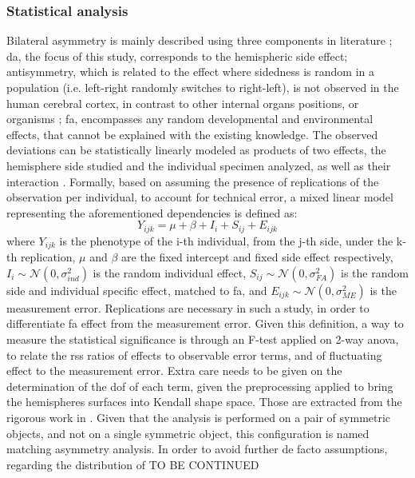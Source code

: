 \subsubsection{Statistical analysis}
Bilateral asymmetry is mainly described using three components in literature \cite{klingenberg2002}\cite{Vingerhoets2021}; \acf{da}, the focus of this study, corresponds to the hemispheric side effect; antisymmetry, which is related to the effect where sidedness is random in a population (i.e. left-right randomly switches to right-left), is not observed in the human cerebral cortex, in contrast to other internal organs positions, or organisms \cite{Neubauer2020}; \acf{fa}, encompasses any random developmental and environmental effects, that cannot be explained with the existing knowledge. The observed deviations can be statistically linearly modeled as products of two effects, the hemisphere side studied and the individual specimen analyzed, as well as their interaction \cite{klingenberg2002}. Formally, based on \cite{VanDongen1999} assuming the presence of replications of the observation per individual, to account for technical error, a mixed linear model representing the aforementioned dependencies is defined as:
\begin{equation}
	Y_{ijk} = \mu + \beta + I_i + S_{ij} + E_{ijk}
\end{equation}
where $Y_{ijk}$ is the phenotype of the i-th individual, from the j-th side, under the k-th replication, $\mu$ and $\beta$ are the fixed intercept and fixed side effect respectively, $I_i\sim\mathcal{N}(0,\sigma^2_{ind})$ is the random individual effect,  $S_{ij}\sim\mathcal{N}(0,\sigma^2_{FA})$ is the random side and individual specific effect, matched to \ac{fa}, and $E_{ijk}\sim\mathcal{N}(0,\sigma^2_{ME})$ is the measurement error. Replications are necessary in such a study, in order to differentiate \ac{fa} effect from the measurement error. Given this definition, a way to measure the statistical significance is through an F-test applied on 2-way \ac{anova}, to relate the \ac{rss} ratios of effects to observable error terms, and of fluctuating effect to the measurement error. Extra care needs to be given on the determination of the \ac{dof} of each term, given the preprocessing applied to bring the hemispheres surfaces into Kendall shape space. Those are extracted from the rigorous work in \cite{klingenberg2002}. Given that the analysis is performed on a pair of symmetric objects, and not on a single symmetric object, this configuration is named matching asymmetry analysis. In order to avoid further de facto assumptions, regarding the distribution of TO BE CONTINUED
